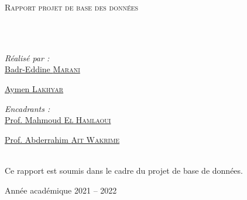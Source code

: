 \documentclass[
	11pt,
	oneside,
	openany,
	french,
	onehalfspacing,
	liststotoc,
	toctotoc,
	parskip,
	headsepline,
	consistentlayout,
]{template}
\author{Badr-Eddine \textsc{Marani} \\ Badr-Eddine \textsc{Marani}}
\begin{document}
	\pagestyle{plain}
	\begin{titlepage}
		\begin{center}
			\vspace*{.06\textheight}
			{\scshape\LARGE \univname\par}\vspace{1.5cm}
			\textsc{\Large Rapport projet de base des données}\\[0.5cm]

			\HRule \\[0.4cm]
			{\huge \bfseries \ttitle\par}\vspace{0.4cm}
			\HRule \\[1.5cm]

			\begin{minipage}[t]{0.4\textwidth}
				\begin{flushleft} \large
					\emph{Réalisé par :}\\
					\href{mailto:badr-eddine.marani@centrale-casablanca.ma}{Badr-Eddine \textsc{Marani}}

					\href{mailto:aymen.lakhyar@centrale-casablanca.ma}{Aymen \textsc{Lakhyar}}
				\end{flushleft}
			\end{minipage}
			\begin{minipage}[t]{0.4\textwidth}
				\begin{flushright} \large
					\emph{Encadrants :} \\
					\href{}{Prof. Mahmoud \textsc{El Hamlaoui}}

					\href{}{Prof. Abderrahim \textsc{Ait Wakrime}}


				\end{flushright}
			\end{minipage}\\[3cm]


			\Large Ce rapport est soumis dans le cadre du projet de base de données.\\[0.3cm]

			\vspace*{\fill}

			{\large Année académique 2021 -- 2022}\\[4cm]
		\end{center}
	\end{titlepage}

	\tableofcontents

	\listoffigures

	\listoftables

	
	
	
	
	

	\appendix
    
    
\end{document}
